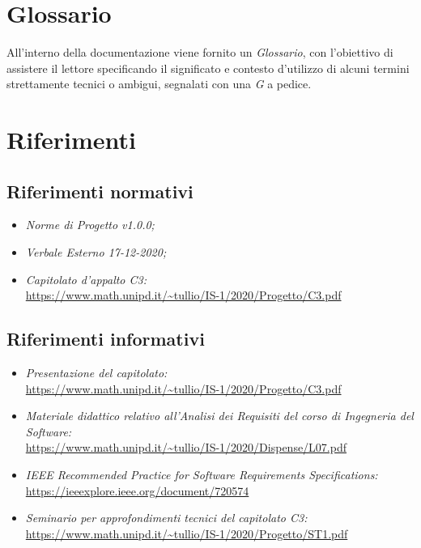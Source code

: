 \section{Glossario}\label{introduzioneGlossario}
All'interno della documentazione viene fornito un \textit{Glossario}, con l'obiettivo di assistere il lettore specificando il significato e contesto d'utilizzo di alcuni termini strettamente tecnici o ambigui, segnalati con una \textit{G} a pedice.

\section{Riferimenti}\label{introduzioneRiferimenti}
\subsection{Riferimenti normativi}\label{introduzioneRiferimentiNormativi}
\begin{itemize}
	\item \textit{Norme di Progetto v1.0.0;}
		\item \textit{Verbale Esterno 17-12-2020;}
		\item \textit{Capitolato d'appalto C3:} \\ \url{https://www.math.unipd.it/~tullio/IS-1/2020/Progetto/C3.pdf}
\end{itemize}
\subsection{Riferimenti informativi}\label{introduzioneRiferimentiInformativi}
\begin{itemize}
	\item \textit{Presentazione del capitolato:} \\ \url{https://www.math.unipd.it/~tullio/IS-1/2020/Progetto/C3.pdf}
		\item \textit{Materiale didattico relativo all'Analisi dei Requisiti del corso di Ingegneria del Software:}\\ \url{https://www.math.unipd.it/~tullio/IS-1/2020/Dispense/L07.pdf}
	\item \textit{IEEE Recommended Practice for Software Requirements Specifications:}\\
		\url{https://ieeexplore.ieee.org/document/720574}
	\item \textit{Seminario per approfondimenti tecnici del capitolato C3:}\\
		\url{https://www.math.unipd.it/~tullio/IS-1/2020/Progetto/ST1.pdf}		
\end{itemize}